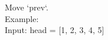 \documentclass[preview]{standalone}
\begin{document}
Move `prev`.\\Example:\\Input: head = [1, 2, 3, 4, 5]\\
\end{document}
